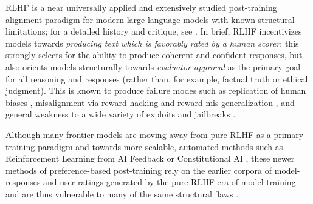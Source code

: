 
RLHF is a near universally applied \cite{christiano_deep_2017, anthropic_introducing_2023, google_bard_2023, touvron_llama_2023, google_deepmind_gemini_2026, spacexai_introducing_2026} and extensively studied post-training alignment paradigm for modern large language models with known structural limitations; for a detailed history and critique, see \citet{casper_open_2023}. In brief, RLHF incentivizes models towards \textit{producing text which is favorably rated by a human scorer}; this strongly selects for the ability to produce coherent and confident responses, but also orients models structurally towards \textit{evaluator approval} as the primary goal for all reasoning and responses (rather than, for example, factual truth or ethical judgment). This is known to produce failure modes such as replication of human biases \cite{bender_dangers_2021}, misalignment via reward-hacking and reward mis-generalization \cite{skalse_defining_nodate, wang_reward_2026}, and general weakness to a wide variety of exploits and jailbreaks \cite{wei_jailbroken_2023}. 

Although many frontier models are moving away from pure RLHF as a primary training paradigm and towards more scalable, automated methods such as Reinforcement Learning from AI Feedback or Constitutional AI \cite{anthropic_system_2026-1, anthropic_system_2026-2, openai_gpt-6_2026, deepseek-ai_deepseek-v41-flash_2026, qwen_team_qwen38-max_2026}, these newer methods of preference-based post-training rely on the earlier corpora of model-responses-and-user-ratings generated by the pure RLHF era of model training and are thus vulnerable to many of the same structural flaws \cite{bai_constitutional_2022, lee_rlaif_2024, srivastava_technical_2026}.

